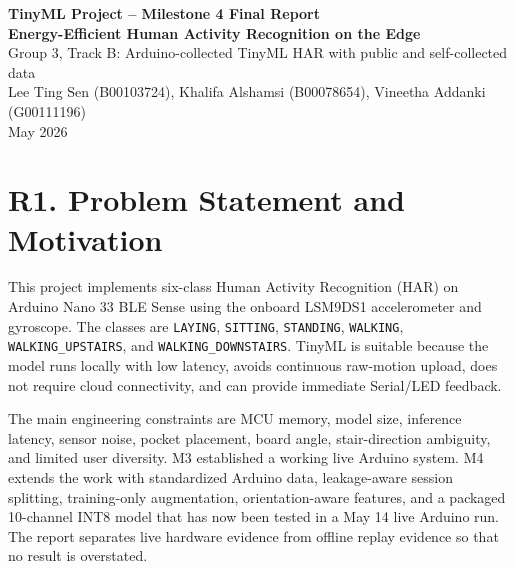 \documentclass[11pt,a4paper]{article}
\begin{document}
\normalsize

\begin{center}
{\Large \textbf{TinyML Project -- Milestone 4 Final Report}}\\
{\large \textbf{Energy-Efficient Human Activity Recognition on the Edge}}\\
Group 3, Track B: Arduino-collected TinyML HAR with public and self-collected data\\
Lee Ting Sen (B00103724), Khalifa Alshamsi (B00078654), Vineetha Addanki (G00111196)\\
May 2026
\end{center}

\begin{center}
\end{center}

\section{R1. Problem Statement and Motivation}

This project implements six-class Human Activity Recognition (HAR) on Arduino Nano 33 BLE Sense using the onboard LSM9DS1 accelerometer and gyroscope. The classes are \texttt{LAYING}, \texttt{SITTING}, \texttt{STANDING}, \texttt{WALKING}, \texttt{WALKING\_UPSTAIRS}, and \texttt{WALKING\_DOWNSTAIRS}. TinyML is suitable because the model runs locally with low latency, avoids continuous raw-motion upload, does not require cloud connectivity, and can provide immediate Serial/LED feedback.

The main engineering constraints are MCU memory, model size, inference latency, sensor noise, pocket placement, board angle, stair-direction ambiguity, and limited user diversity. M3 established a working live Arduino system. M4 extends the work with standardized Arduino data, leakage-aware session splitting, training-only augmentation, orientation-aware features, and a packaged 10-channel INT8 model that has now been tested in a May 14 live Arduino run. The report separates live hardware evidence from offline replay evidence so that no result is overstated.
\end{document}
